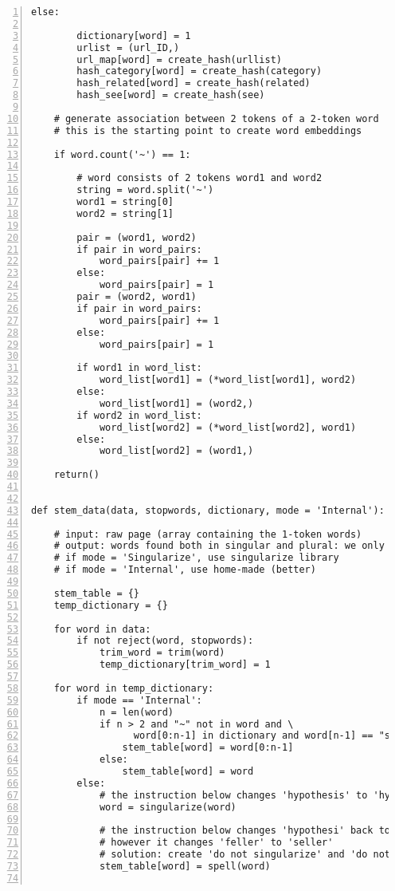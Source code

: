 \documentclass[oneside,10pt]{book}
\begin{document}
\begin{lstlisting}[numbers=left]
    else: 

        dictionary[word] = 1 
        urlist = (url_ID,)
        url_map[word] = create_hash(urllist)  
        hash_category[word] = create_hash(category)
        hash_related[word] = create_hash(related)   
        hash_see[word] = create_hash(see)

    # generate association between 2 tokens of a 2-token word 
    # this is the starting point to create word embeddings
 
    if word.count('~') == 1:

        # word consists of 2 tokens word1 and word2
        string = word.split('~')
        word1 = string[0]
        word2 = string[1]

        pair = (word1, word2)
        if pair in word_pairs:
            word_pairs[pair] += 1
        else:
            word_pairs[pair] = 1
        pair = (word2, word1)
        if pair in word_pairs:
            word_pairs[pair] += 1
        else:
            word_pairs[pair] = 1

        if word1 in word_list:
            word_list[word1] = (*word_list[word1], word2)
        else:
            word_list[word1] = (word2,)
        if word2 in word_list:
            word_list[word2] = (*word_list[word2], word1)
        else:
            word_list[word2] = (word1,)

    return()


def stem_data(data, stopwords, dictionary, mode = 'Internal'):

    # input: raw page (array containing the 1-token words)
    # output: words found both in singular and plural: we only keep the former
    # if mode = 'Singularize', use singularize library
    # if mode = 'Internal', use home-made (better)

    stem_table = {}
    temp_dictionary = {}

    for word in data:
        if not reject(word, stopwords):
            trim_word = trim(word)  
            temp_dictionary[trim_word] = 1

    for word in temp_dictionary:
        if mode == 'Internal': 
            n = len(word)
            if n > 2 and "~" not in word and \
                  word[0:n-1] in dictionary and word[n-1] == "s":
                stem_table[word] = word[0:n-1]
            else:
                stem_table[word] = word
        else:
            # the instruction below changes 'hypothesis' to 'hypothesi'
            word = singularize(word)

            # the instruction below changes 'hypothesi' back to 'hypothesis'
            # however it changes 'feller' to 'seller' 
            # solution: create 'do not singularize' and 'do not autocorrect' lists
            stem_table[word] = spell(word) 


\end{lstlisting}
\end{document}
